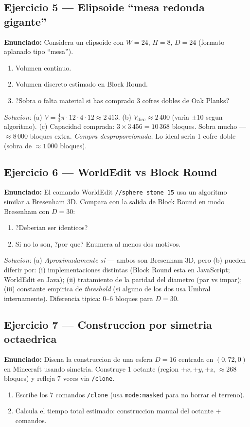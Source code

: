 \documentclass[12pt,a4paper]{scrartcl}
\newcommand{\cmd}[1]{\textcolor{earth}{\texttt{\small #1}}}
\begin{document}
\subsection*{Ejercicio 5 --- Elipsoide \enquote{mesa redonda gigante}}
\textbf{Enunciado:} Considera un elipsoide con $W = 24$, $H = 8$, $D = 24$ (formato aplanado tipo \enquote{mesa}).
\begin{enumerate}[label=\alph*),leftmargin=1.5em,itemsep=0.1em,topsep=0.2em,nosep]
  \item Volumen continuo.
  \item Volumen discreto estimado en Block Round.
  \item ?Sobra o falta material si has comprado 3 cofres dobles de Oak Planks?
\end{enumerate}

\emph{Solucion:}
(a) $V = \tfrac{4}{3}\pi \cdot 12 \cdot 4 \cdot 12 \approx 2\,413$.
(b) $V_{\mathrm{disc}} \approx 2\,400$ (varia $\pm 10$ segun algoritmo).
(c) Capacidad comprada: $3 \times 3\,456 = 10\,368$ bloques. Sobra mucho --- $\approx 8\,000$ bloques extra. \emph{Compra desproporcionada.} Lo ideal seria 1 cofre doble (sobra de $\approx 1\,000$ bloques).

\subsection*{Ejercicio 6 --- WorldEdit vs Block Round}
\textbf{Enunciado:} El comando WorldEdit \cmd{//sphere stone 15} usa un algoritmo similar a Bresenham 3D. Compara con la salida de Block Round en modo Bresenham con $D = 30$:
\begin{enumerate}[label=\alph*),leftmargin=1.5em,itemsep=0.1em,topsep=0.2em,nosep]
  \item ?Deberian ser identicos?
  \item Si no lo son, ?por que? Enumera al menos dos motivos.
\end{enumerate}

\emph{Solucion:}
(a) \emph{Aproximadamente si} --- ambos son Bresenham 3D, pero (b) pueden diferir por: (i) implementaciones distintas (Block Round esta en JavaScript; WorldEdit en Java); (ii) tratamiento de la paridad del diametro (par vs impar); (iii) constante empirica de \emph{threshold} (si alguno de los dos usa Umbral internamente). Diferencia tipica: 0--6 bloques para $D = 30$.

\subsection*{Ejercicio 7 --- Construccion por simetria octaedrica}
\textbf{Enunciado:} Disena la construccion de una esfera $D = 16$ centrada en $(0, 72, 0)$ en Minecraft usando simetria. Construye 1 octante (region $+x, +y, +z$, $\approx 268$ bloques) y refleja 7 veces via \cmd{/clone}.
\begin{enumerate}[label=\alph*),leftmargin=1.5em,itemsep=0.1em,topsep=0.2em,nosep]
  \item Escribe los 7 comandos \cmd{/clone} (usa \cmd{mode:masked} para no borrar el terreno).
  \item Calcula el tiempo total estimado: construccion manual del octante + comandos.
\end{enumerate}
\end{document}
